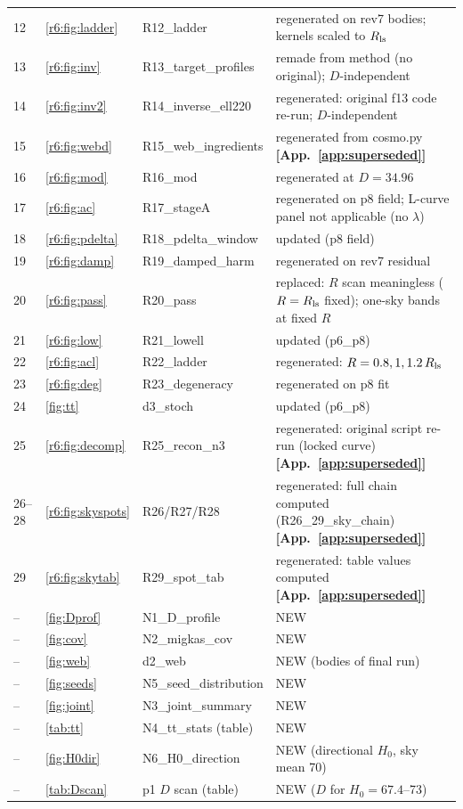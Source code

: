 \documentclass[11pt]{article}
\begin{document}
\begin{longtable}{@{}lllp{6.2cm}@{}}
12 & \ref{r6:fig:ladder} & R12\_ladder & regenerated on rev7 bodies; kernels scaled to $R_{\rm ls}$\\
13 & \ref{r6:fig:inv} & R13\_target\_profiles & remade from method (no original); $D$-independent\\
14 & \ref{r6:fig:inv2} & R14\_inverse\_ell220 & regenerated: original f13 code re-run; $D$-independent\\
15 & \ref{r6:fig:webd} & R15\_web\_ingredients & regenerated from cosmo.py \textbf{[App.~\ref{app:superseded}]}\\
16 & \ref{r6:fig:mod} & R16\_mod & regenerated at $D=34.96$\\
17 & \ref{r6:fig:ac} & R17\_stageA & regenerated on p8 field; L-curve panel not applicable (no $\lambda$)\\
18 & \ref{r6:fig:pdelta} & R18\_pdelta\_window & updated (p8 field)\\
19 & \ref{r6:fig:damp} & R19\_damped\_harm & regenerated on rev7 residual\\
20 & \ref{r6:fig:pass} & R20\_pass & replaced: $R$ scan meaningless ($R=R_{\rm ls}$ fixed); one-sky bands at fixed $R$\\
21 & \ref{r6:fig:low} & R21\_lowell & updated (p6\_p8)\\
22 & \ref{r6:fig:acl} & R22\_ladder & regenerated: $R=0.8,1,1.2\,R_{\rm ls}$\\
23 & \ref{r6:fig:deg} & R23\_degeneracy & regenerated on p8 fit\\
24 & \ref{fig:tt} & d3\_stoch & updated (p6\_p8)\\
25 & \ref{r6:fig:decomp} & R25\_recon\_n3 & regenerated: original script re-run (locked curve) \textbf{[App.~\ref{app:superseded}]}\\
26--28 & \ref{r6:fig:skyspots} & R26/R27/R28 & regenerated: full chain computed (R26\_29\_sky\_chain) \textbf{[App.~\ref{app:superseded}]}\\
29 & \ref{r6:fig:skytab} & R29\_spot\_tab & regenerated: table values computed \textbf{[App.~\ref{app:superseded}]}\\
-- & \ref{fig:Dprof} & N1\_D\_profile & NEW\\
-- & \ref{fig:cov} & N2\_migkas\_cov & NEW\\
-- & \ref{fig:web} & d2\_web & NEW (bodies of final run)\\
-- & \ref{fig:seeds} & N5\_seed\_distribution & NEW\\
-- & \ref{fig:joint} & N3\_joint\_summary & NEW\\
-- & \ref{tab:tt} & N4\_tt\_stats (table) & NEW\\
-- & \ref{fig:H0dir} & N6\_H0\_direction & NEW (directional $H_0$, sky mean 70)\\
-- & \ref{tab:Dscan} & p1 $D$ scan (table) & NEW ($D$ for $H_0=67.4$--73)\\
\bottomrule\end{longtable}
\end{document}
